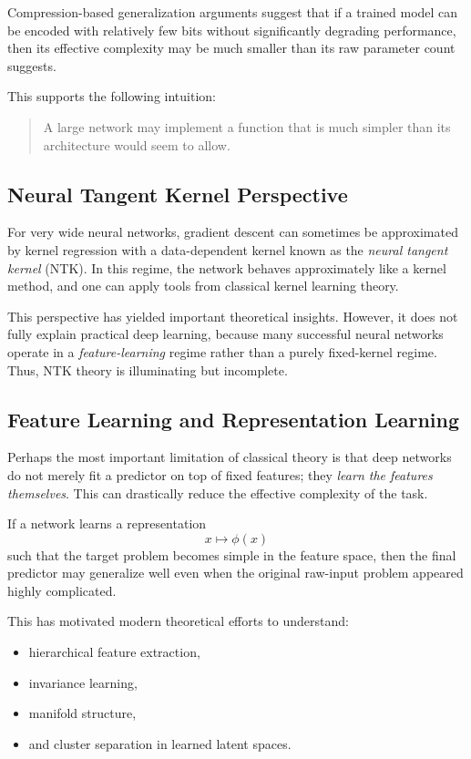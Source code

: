 Compression-based generalization arguments suggest that if a trained model can be encoded with relatively few bits without significantly degrading performance, then its effective complexity may be much smaller than its raw parameter count suggests.

This supports the following intuition:

\begin{quote}
A large network may implement a function that is much simpler than its architecture would seem to allow.
\end{quote}

\subsection{Neural Tangent Kernel Perspective}

For very wide neural networks, gradient descent can sometimes be approximated by kernel regression with a data-dependent kernel known as the \emph{neural tangent kernel} (NTK). In this regime, the network behaves approximately like a kernel method, and one can apply tools from classical kernel learning theory.

This perspective has yielded important theoretical insights. However, it does not fully explain practical deep learning, because many successful neural networks operate in a \emph{feature-learning} regime rather than a purely fixed-kernel regime. Thus, NTK theory is illuminating but incomplete.

\subsection{Feature Learning and Representation Learning}

Perhaps the most important limitation of classical theory is that deep networks do not merely fit a predictor on top of fixed features; they \emph{learn the features themselves}. This can drastically reduce the effective complexity of the task.

If a network learns a representation
\[
x \mapsto \phi(x)
\]
such that the target problem becomes simple in the feature space, then the final predictor may generalize well even when the original raw-input problem appeared highly complicated.

This has motivated modern theoretical efforts to understand:
\begin{itemize}
    \item hierarchical feature extraction,
    \item invariance learning,
    \item manifold structure,
    \item and cluster separation in learned latent spaces.
\end{itemize}

